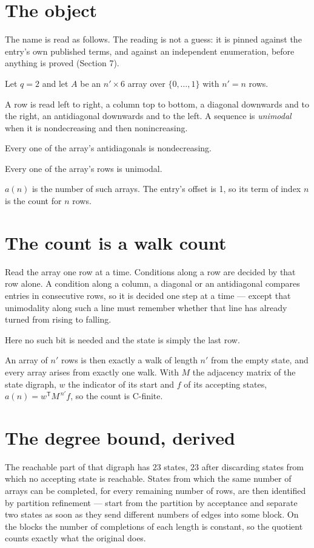 \documentclass[11pt]{article}
\theoremstyle{definition}
\begin{document}
\section{The object}

The name is read as follows. The reading is not a guess: it is pinned against the entry's own published terms, and against an independent enumeration, before anything is proved (Section 7).

Let $q = 2$ and let $A$ be an $n' \times 6$ array over $\{0,\dots,1\}$ with $n' = n$ rows.

A row is read left to right, a column top to bottom, a diagonal downwards and to the right, an antidiagonal downwards and to the left. A sequence is {\itshape unimodal} when it is nondecreasing and then nonincreasing.

Every one of the array's antidiagonals is nondecreasing.

Every one of the array's rows is unimodal.

$a(n)$ is the number of such arrays. The entry's offset is 1, so its term of index $n$ is the count for $n$ rows.

\section{The count is a walk count}

Read the array one row at a time. Conditions along a row are decided by that row alone. A condition along a column, a diagonal or an antidiagonal compares entries in consecutive rows, so it is decided one step at a time --- except that unimodality along such a line must remember whether that line has already turned from rising to falling.

Here no such bit is needed and the state is simply the last row.

An array of $n'$ rows is then exactly a walk of length $n'$ from the empty state, and every array arises from exactly one walk. With $M$ the adjacency matrix of the state digraph, $w$ the indicator of its start and $f$ of its accepting states, $a(n) = w^{\mathsf T}M^{\,n'}f$, so the count is C-finite.

\section{The degree bound, derived}

The reachable part of that digraph has $23$ states, $23$ after discarding states from which no accepting state is reachable. States from which the same number of arrays can be completed, for every remaining number of rows, are then identified by partition refinement --- start from the partition by acceptance and separate two states as soon as they send different numbers of edges into some block. On the blocks the number of completions of each length is constant, so the quotient counts exactly what the original does.
\end{document}
